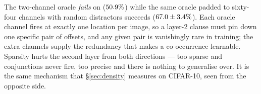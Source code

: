  The two-channel oracle \emph{fails} on
 ($50.9{}\%$) while the same oracle padded to sixty-four channels
with random distractors succeeds ($67.0{} \pm
3.4{}\%$). Each oracle channel fires at exactly one location per
image, so a layer-2 clause must pin down one specific pair of offsets, and any given pair is
vanishingly rare in training; the extra channels supply the redundancy that makes a
co-occurrence learnable. Sparsity hurts the second layer from both directions --- too sparse
and conjunctions never fire, too precise and there is nothing to generalise over. It is the
same mechanism that \S\ref{sec:density} measures on CIFAR-10, seen from the opposite side.
